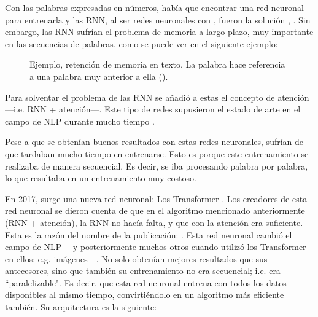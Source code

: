 Con las palabras expresadas en números, había que encontrar una red neuronal para entrenarla y las RNN\fnm, al ser redes neuronales con , fueron la solución \parencite{seq2seq}, \parencite{rnnEncoderDecoder}. Sin embargo, las RNN sufrían el problema de memoria a largo plazo, muy importante en las secuencias de palabras, como se puede ver en el siguiente ejemplo:

\begin{figure}[H]
    \centering
    \caption{Ejemplo, retención de memoria en texto. La palabra  hace referencia a una palabra muy anterior a ella ().}
\end{figure}

Para solventar el problema de las RNN se añadió a estas el concepto de atención ---i.e. RNN + atención---\parencite{rnnPlusAttention}. Este tipo de redes supusieron el estado de arte en el campo de NLP durante mucho tiempo \parencite{rnnAttentionMejorada1} \parencite{rnnAttentionMejorada2} \parencite{rnnAttentionMejorada3}.

Pese a que se obtenían buenos resultados con estas redes neuronales, sufrían de que tardaban mucho tiempo en entrenarse. Esto es porque este entrenamiento se realizaba de manera secuencial. Es decir, se iba procesando palabra por palabra, lo que resultaba en un entrenamiento muy costoso.

En 2017, surge una nueva red neuronal: Los Transformer \parencite{transformers}. Los creadores de esta red neuronal se dieron cuenta de que en el algoritmo mencionado anteriormente (RNN + atención), la RNN no hacía falta, y que con la atención era suficiente. Esta es la razón del nombre de la publicación: . Esta red neuronal cambió el campo de NLP ---y posteriormente muchos otros cuando utilizó los Transformer en ellos: e.g. imágenes---. No solo obtenían mejores resultados que sus antecesores, sino que también su entrenamiento no era secuencial; i.e. era ``paralelizable". Es decir, que esta red neuronal entrena con todos los datos disponibles al mismo tiempo, convirtiéndolo en un algoritmo más eficiente también. Su arquitectura es la siguiente:

